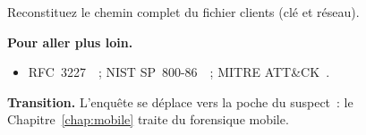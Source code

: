 \begin{boxexo}[title={\ding{45}\quad Exercice~13.10. Chemin de la donnée \niveauexpert}]
Reconstituez le chemin complet du fichier clients (clé et réseau).
\end{boxexo}

\bigskip

\begin{boxinfo}
\textbf{Pour aller plus loin.}
\begin{itemize}
    \item RFC~3227~\cite{rfc3227}~; NIST SP~800-86~\cite{nist80086}~;
          MITRE ATT\&CK~\cite{mitreattack}.
\end{itemize}
\end{boxinfo}

\begin{boxinfo}
\textbf{Transition.} L'enquête se déplace vers la poche du suspect~: le
Chapitre~\ref{chap:mobile} traite du forensique mobile.
\end{boxinfo}
